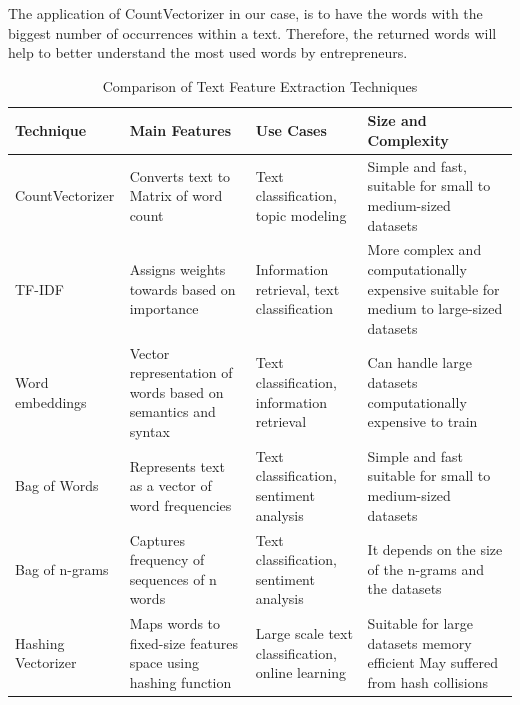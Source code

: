 The application of CountVectorizer in our case, is to have the words with the biggest number of occurrences within a text. Therefore, the returned words will help to better understand the most used words by entrepreneurs.

\begin{table}[H]
\caption{Comparison of Text Feature Extraction Techniques\cite{Eskandar_2023}}
\label{tab:featuresExtraction}
\begin{tabular}{m{7em}m{10em}m{7em}m{12em}}
\hline
\textbf{Technique} &
  \textbf{Main Features} &
  \textbf{Use Cases} &
  \textbf{Size and Complexity} \\ \hline
CountVectorizer &
  Converts text to Matrix of word count &
  {\color[HTML]{111B21} Text classification, topic modeling} &
  Simple and fast, suitable for small to medium-sized datasets \\ \hline
TF-IDF &
  {\color[HTML]{111B21} Assigns weights towards based on importance} &
  {\color[HTML]{111B21} Information retrieval, text classification} &
  {\color[HTML]{111B21} More complex and computationally expensive suitable for medium to large-sized datasets} \\ \hline
Word embeddings &
  Vector representation of words based on semantics and syntax &
  {\color[HTML]{111B21} Text classification, information retrieval} &
  Can handle large datasets computationally expensive to train \\ \hline
Bag of  Words &
  Represents text as a vector of  word frequencies &
  Text classification, sentiment analysis &
  Simple and fast suitable for small to medium-sized datasets \\ \hline
Bag of n-grams &
  Captures frequency of sequences of n words &
  Text classification, sentiment analysis &
  It depends on the size of the n-grams and the datasets \\ \hline
Hashing Vectorizer &
  Maps words to fixed-size features space using hashing function &
  Large scale text classification, online learning &
  Suitable for large datasets memory efficient May suffered from hash collisions \\ \hline
\end{tabular}
\end{table}

